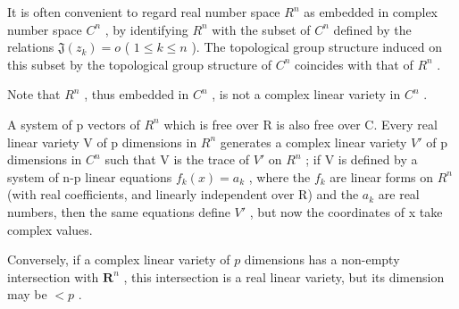 It is often convenient to regard real number space \(R^{n}\) as embedded in complex number space \(C^{n}\) , by identifying \(R^{n}\) with the subset of \(C^{n}\) defined by the relations \(\mathfrak{J}(z_{k}) = o\) ( \(1 \leqslant k \leqslant n\) ). The topological group structure induced on this subset by the topological group structure of \(C^{n}\) coincides with that of \(R^{n}\) .

Note that \(R^{n}\) , thus embedded in \(C^{n}\) , is not a complex linear variety in \(C^{n}\) .

A system of p vectors of \(R^{n}\) which is free over R is also free over C. Every real linear variety V of p dimensions in \(R^{n}\) generates a complex linear variety \(V'\) of p dimensions in \(C^{n}\) such that V is the trace of \(V'\) on \(R^{n}\) ; if V is defined by a system of n-p linear equations \(f_{k}(x)=a_{k}\) , where the \(f_{k}\) are linear forms on \(R^{n}\) (with real coefficients, and linearly independent over R) and the \(a_{k}\) are real numbers, then the same equations define \(V'\) , but now the coordinates of x take complex values.

Conversely, if a complex linear variety of \(p\) dimensions has a non-empty intersection with \(\mathbf{R}^n\) , this intersection is a real linear variety, but its dimension may be \(< p\) .

